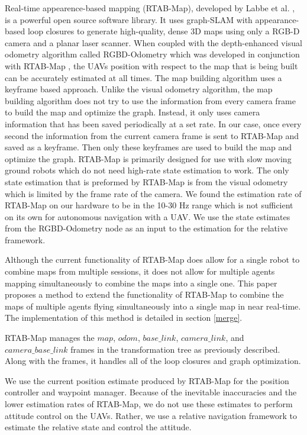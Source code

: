\documentclass[letterpaper, 10 pt, conference]{ieeeconf}  %
\begin{document}
Real-time appearence-based mapping (RTAB-Map), developed by Labbe et al. \cite{Labbe2011}\cite{Labbe2013}\cite{Labbe2019}, is a powerful open source software library. It uses graph-SLAM with appearance-based loop closures to generate high-quality, dense 3D maps using only a RGB-D camera and a planar laser scanner. When coupled with the depth-enhanced visual odometry algorithm called RGBD-Odometry which was developed in conjunction with RTAB-Map \cite{Labbe2019}, the UAVs position with respect to the map that is being built can be accurately estimated at all times. The map building algorithm uses a keyframe based approach. Unlike the visual odometry algorithm, the map building algorithm does not try to use the information from every camera frame to build the map and optimize the graph. Instead, it only uses camera information that has been saved periodically at a set rate. In our case, once every second the information from the current camera frame is sent to RTAB-Map and saved as a keyframe. Then only these keyframes are used to build the map and optimize the graph. RTAB-Map is primarily designed for use with slow moving ground robots which do not need high-rate state estimation to work. The only state estimation that is preformed by RTAB-Map is from the visual odometry which is limited by the frame rate of the camera. We found the estimation rate of RTAB-Map on our hardware to be in the 10-30 Hz range which is not sufficient on its own for autonomous navigation with a UAV. We use the state estimates from the RGBD-Odometry node as an input to the estimation for the relative framework.

Although the current functionality of RTAB-Map does allow for a single robot to combine maps from multiple sessions, it does not allow for multiple agents mapping simultaneously to combine the maps into a single one. This paper proposes a method to extend the functionality of RTAB-Map to combine the maps of multiple agents flying simultaneously into a single map in near real-time. The implementation of this method is detailed in section \ref{merge}.

RTAB-Map manages the $\mathit{map}$, $\mathit{odom}$, $\mathit{base\_link}$, $\mathit{camera\_link}$, and $\mathit{camera\_base\_link}$ frames in the transformation tree as previously described. Along with the frames, it handles all of the loop closures and graph optimization.

We use the current position estimate produced by RTAB-Map for the position controller and waypoint manager. Because of the inevitable inaccuracies and the lower estimation rates of RTAB-Map, we do not use these estimates to perform attitude control on the UAVs. Rather, we use a relative navigation framework to estimate the relative state and control the attitude.
\end{document}
